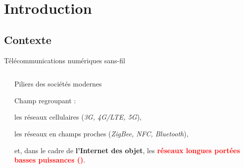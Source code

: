 \documentclass[../main.tex]{subfiles}
\begin{document}
\section{Introduction}

\subsection{Contexte}

\begin{frame}{Télécommunications numériques sans-fil}
  \begin{columns}
    \begin{column}{.4\linewidth}
      \begin{center}
      \end{center}
    \end{column}
    \begin{column}{.55\linewidth}
      \begin{overlayarea}{\linewidth}{.6\textheight}
        \begin{ctrlitemize}{1em}
          \item Piliers des sociétés modernes
          \item Champ regroupant :
          \begin{ctrlitemize}{1em}
            \scriptsize
            \item les réseaux cellulaires (\textit{3G, 4G/LTE, 5G}),
            \item les réseaux en champs proches (\textit{ZigBee, NFC, Bluetooth}),
            \item et, dans le cadre de \textbf{l'Internet des objet}, les \textbf{\textcolor{red}{réseaux longues portées basses puissances ()}}.
          \end{ctrlitemize}
        \end{ctrlitemize}
      \end{overlayarea}
    \end{column}
  \end{columns}
\end{frame}
\end{document}
